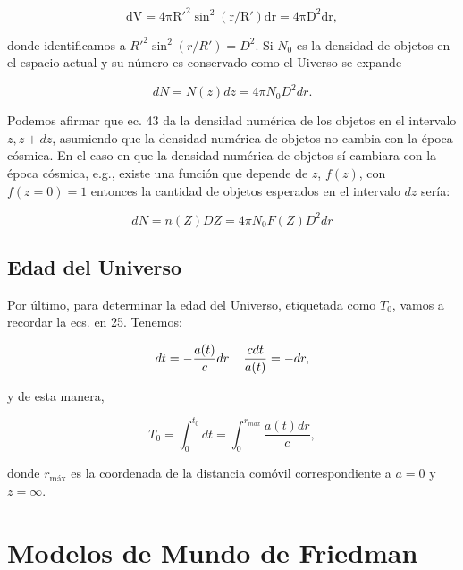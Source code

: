 \documentclass{article}
\begin{document}
    \begin{equation}
        \mathrm{ dV = 4\pi R'^2 \sin^2 (r/R') dr = 4\pi D^2 dr, }
    \end{equation}

    donde identificamos a $R'^2 \sin^2 (r/R') = D^2$. Si $N_0$ es la densidad de objetos en el espacio actual y su número es conservado como el Uiverso se expande 

    \begin{equation}
        dN = N(z) dz = 4\pi N_0 D^2 dr. 
    \end{equation}

    Podemos afirmar que ec. 43 da la densidad numérica de los objetos en el intervalo $z, z +dz$, asumiendo que la densidad numérica de objetos no cambia con la época cósmica. En el caso en que la densidad numérica de objetos sí cambiara con la época cósmica, e.g., existe una función que depende de $z$, $f(z)$, con $f(z=0) =1$ entonces la cantidad de objetos esperados en el intervalo $dz$ sería: 

    \begin{equation}
        dN= n(Z) DZ = 4\pi N_0 F(Z) D^2 dr
    \end{equation}



\subsection{Edad del Universo}

    Por último, para determinar la edad del Universo, etiquetada como $T_0$, vamos a recordar la ecs. en 25. Tenemos:


    \begin{equation}
        dt = - \frac{a(t)}{c} dr \hspace{0.4cm} \frac{c dt}{a(t)} = -dr,
    \end{equation} 

    y de esta manera, 

    \begin{equation}
        T_0 = \int_0^{t_0}{dt } = \int_0^{r_{max}}{\frac{a(t) dr}{c}},
    \end{equation}
    
    donde $r_{{\text{máx}}}$ es la coordenada de la distancia comóvil correspondiente a $a=0$ y $z = \infty$.
    
    
    \section{Modelos de Mundo de Friedman}
    
\end{document}
